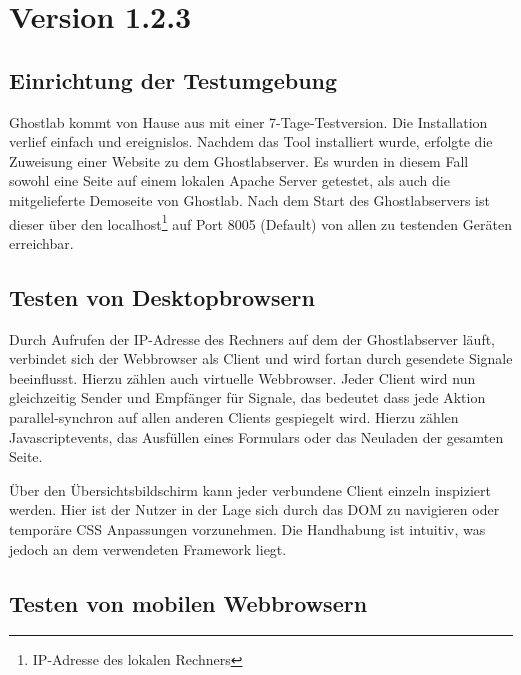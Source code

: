 	\section{ Version 1.2.3}
		\subsection {Einrichtung der Testumgebung}
		Ghostlab kommt von Hause aus mit einer 7-Tage-Testversion. Die Installation verlief einfach und ereignislos. Nachdem das Tool installiert wurde, erfolgte die Zuweisung einer Website zu dem Ghostlabserver. Es wurden in diesem Fall sowohl eine Seite auf einem lokalen \Gls{Apache} Server getestet, als auch die mitgelieferte Demoseite von Ghostlab. Nach dem Start des Ghostlabservers ist dieser über den localhost\footnote{IP-Adresse des lokalen Rechners} auf Port 8005 (Default) von allen zu testenden Geräten erreichbar.
		
		\subsection{Testen von Desktopbrowsern}
		Durch Aufrufen der IP-Adresse des Rechners auf dem der Ghostlabserver läuft, verbindet sich der \Gls{Webbrowser} als Client und wird fortan durch gesendete Signale beeinflusst. Hierzu zählen auch virtuelle \Gls{Webbrowser}. Jeder Client wird nun gleichzeitig Sender und Empfänger für Signale, das bedeutet dass jede Aktion \gls{parallel-synchron} auf allen anderen Clients gespiegelt wird. Hierzu zählen \Gls{Javascript}events, das Ausfüllen eines Formulars oder das Neuladen der gesamten Seite.
		
		Über den Übersichtsbildschirm kann jeder verbundene Client einzeln inspiziert werden. Hier ist der Nutzer in der Lage sich durch das \Gls{DOM} zu navigieren oder temporäre CSS Anpassungen vorzunehmen. Die Handhabung ist intuitiv, was jedoch an dem verwendeten \Gls{Framework}  liegt.
		
		\pagebreak
		\subsection{Testen von mobilen \Gls{Webbrowser}n}
		
